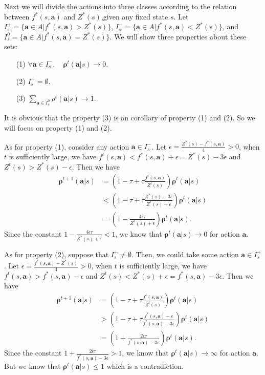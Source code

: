 \documentclass{article}
\begin{document}
    Next we will divide the actions into three classes according to the relation between $f^*(s,\bm{a})$ and $Z^*(s)$,given any fixed state $s$. Let $I^+_s = \{\bm{a} \in A| f^*(s,\bm{a}) > Z^*(s) \}$, $I^-_s = \{\bm{a} \in A| f^*(s,\bm{a}) < Z^*(s) \}$, and $I^0_s = \{\bm{a} \in A| f^*(s,\bm{a}) = Z^*(s) \}$. We will show three properties about these sets:
    \begin{itemize}
        \item[(1)] $\forall \bm{a} \in I^-_s, \quad \bm{\rho}^t(\bm{a}|s) \to 0$.
        \item[(2)] $I^+_s = \emptyset$.
        \item[(3)] $\sum_{\bm{a} \in I^0_s} \rho^t(\bm{a}|s) \to 1$.
    \end{itemize}
    It is obvious that the property (3) is an corollary of property (1) and (2). So we will focus on property (1) and (2).
    
    As for property (1), consider any action $\bm{a} \in I^-_s$. Let $\epsilon = \frac{Z^*(s) - f^*(s,\bm{a})}{4} > 0$, when $t$ is sufficiently large, we have $f^t(s,\bm{a}) < f^*(s,\bm{a}) + \epsilon = Z^*(s) - 3\epsilon$ and $Z^t(s) > Z^*(s) - \epsilon $. Then we have 
    \begin{align*}
        \bm{\rho}^{t+1}(\bm{a}|s) & = \left( 1 - \tau + \tau \frac{f^t(s,\bm{a})}{Z^t(s)} \right)\bm{\rho}^{t}(\bm{a}|s) \\
        &< \left( 1 - \tau + \tau \frac{Z^*(s) - 3\epsilon}{Z^*(s) + \epsilon} \right)\bm{\rho}^{t}(\bm{a}|s) \\
        & = \left( 1 - \frac{ 4\epsilon\tau}{Z^*(s) + \epsilon} \right)\bm{\rho}^{t}(\bm{a}|s).
    \end{align*}
    Since the constant $ 1 - \frac{ 4\epsilon\tau}{Z^*(s) + \epsilon} < 1$, we know that $\bm{\rho}^t(\bm{a}|s) \to 0$ for action $\bm{a}$.
    
    As for property (2), suppose that $I^+_s \not = \emptyset$. Then, we could take some action $\bm{a} \in I^+_s$. Let $\epsilon = \frac{f^*(s,\bm{a}) - Z^*(s)}{4} > 0$, when $t$ is sufficiently large, we have $f^t(s,\bm{a}) > f^*(s,\bm{a}) - \epsilon$ and $Z^t(s) < Z^*(s) + \epsilon = f^*(s,\bm{a}) - 3\epsilon $. Then we have
    \begin{align*}
        \bm{\rho}^{t+1}(\bm{a}|s) & = \left( 1 - \tau + \tau \frac{f^t(s,\bm{a})}{Z^t(s)} \right)\bm{\rho}^{t}(\bm{a}|s) \\
        &> \left( 1 - \tau + \tau \frac{f^*(s,\bm{a}) - \epsilon}{f^*(s,\bm{a}) - 3\epsilon} \right)\bm{\rho}^{t}(\bm{a}|s) \\
        & = \left( 1 + \frac{ 2\epsilon\tau}{f^*(s,\bm{a}) - 3\epsilon} \right)\bm{\rho}^{t}(\bm{a}|s).
    \end{align*}
     Since the constant $ 1 + \frac{ 2\epsilon\tau}{f^*(s,\bm{a}) - 3\epsilon} > 1$, we know that $\bm{\rho}^t(\bm{a}|s) \to \infty$ for action $\bm{a}$. But we know that $\bm{\rho}^t(\bm{a}|s) \le 1$ which is a contradiction. 
     
\end{document}
